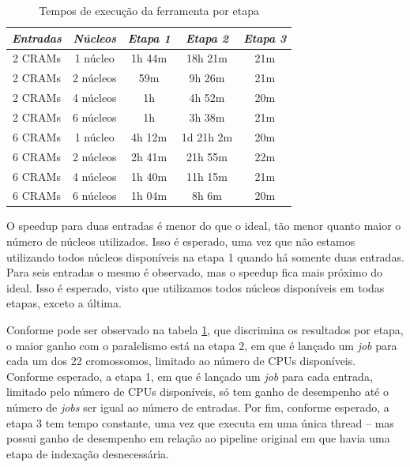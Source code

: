 \documentclass[cic,tc]{iiufrgs}
\begin{document}
\begin{table}[h]
    \caption{Tempos de execução da ferramenta por etapa}
    \centering
        \begin{tabular}{c|c|c|c|c}
          \hline
          \textit{Entradas}  & \textit{Núcleos} & \textit{Etapa 1}  & \textit{Etapa 2} & \textit{Etapa 3} \\
          \hline
          \hline
          2 CRAMs & 1 núcleo  & 1h 44m &    18h 21m & 21m \\
          2 CRAMs & 2 núcleos &    59m &     9h 26m & 21m \\
          2 CRAMs & 4 núcleos & 1h     &     4h 52m & 20m \\
          2 CRAMs & 6 núcleos & 1h     &     3h 38m & 21m \\
          6 CRAMs & 1 núcleo  & 4h 12m & 1d 21h  2m & 20m \\
          6 CRAMs & 2 núcleos & 2h 41m &    21h 55m & 22m \\
          6 CRAMs & 4 núcleos & 1h 40m &    11h 15m & 21m \\
          6 CRAMs & 6 núcleos & 1h 04m &     8h  6m & 20m \\
          \hline
        \end{tabular}
    \label{tbl:stages}
\end{table}

O speedup para duas entradas é menor do que o ideal, tão menor quanto maior o
número de núcleos utilizados. Isso é esperado, uma vez que não estamos
utilizando todos núcleos disponíveis na etapa 1 quando há somente duas
entradas. Para seis entradas o mesmo é observado, mas o speedup fica mais
próximo do ideal. Isso é esperado, visto que utilizamos todos núcleos
disponíveis em todas etapas, exceto a última.

Conforme pode ser observado na tabela \ref{tbl:stages}, que discrimina os
resultados por etapa, o maior ganho com o paralelismo está na etapa 2, em que é
lançado um \textit{job} para cada um dos 22 cromossomos, limitado ao número de
CPUs disponíveis. Conforme esperado, a etapa 1, em que é lançado um
\textit{job} para cada entrada, limitado pelo número de CPUs disponíveis, só
tem ganho de desempenho até o número de \textit{jobs} ser igual ao número de
entradas. Por fim, conforme esperado, a etapa 3 tem tempo constante, uma vez
que executa em uma única thread -- mas possui ganho de desempenho em relação ao
pipeline original em que havia uma etapa de indexação desnecessária.
\end{document}
